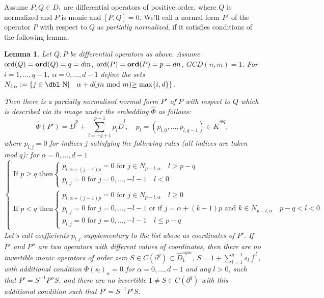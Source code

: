 \documentclass[11pt]{article}
\theoremstyle{definition}
\newcommand{\dn}{{\mbox{\dbl N}}}
\newcommand{\ord}{\mathop{\rm ord}\nolimits}
\theoremstyle{plain}
\newtheorem{lemma}{Lemma}[section]
\numberwithin{equation}{section}
\newcommand{\Ord}{\mathop {\rm \bf ord}}
\begin{document}
Assume $P,Q\in D_1$ are differential operators of positive order, where $Q$ is normalized and $P$ is monic and $[P,Q]=0$. We'll call a normal form $P'$ of the operator $P$ with respect to $Q$ as {\it partially normalized}, if it satisfies conditions of the following lemma.

\begin{lemma}
\label{L:normalisation}
Let $Q,P$ be differential operators as above. Assume $\ord (Q)=\Ord (Q)=q=dm$, $\ord (P)=\Ord (P)=p=dn$, 
$GCD(n,m)=1$. 
For $i=1, \ldots , q-1$, $\alpha = 0, \ldots , d-1$  define the sets $N_{i,\alpha}:=\{j\in \dn |\quad \mbox{$\alpha +d$($jn$ mod $m$)$\ge \max\{i,d\}$}\}$. 
  
Then there is a partially normalised normal form $P'$ of $P$ with respect to $Q$ which is described via 
its image under the embedding $\hat{\Phi}$ as follows: 
$$
\hat{\Phi}(P')=\tilde{D}^p +\sum_{l=-q+1}^{p-1} p_l \tilde{D}^l, \quad p_l=(p_{l,0},\ldots ,p_{l,q-1})\in \tilde{K}^{\oplus q},
$$
where $p_{l,j}=0$ for indices $j$ satisfying the following rules (all indices are taken mod $q$): for $\alpha = 0, \ldots , d-1$  
$$
\begin{cases}
\mbox{If $p\ge q$ then} 
\begin{cases}
p_{l,\alpha +(j-1)p}=\mbox{$0$ for $j\in N_{p-l, \alpha}$}\quad l>p-q \\
p_{l,j}=\mbox{$0$ for $j=0,\ldots ,-l-1$} \quad l<0
\end{cases}
\\
\mbox{If $p< q$ then}
\begin{cases}
p_{l,\alpha +(j-1)p}=\mbox{$0$ for $j\in N_{p-l, \alpha}$}\quad l\ge 0 \\
p_{l,j}=\mbox{$0$ for  $j=0,\ldots ,-l-1$ or if $j=\alpha +(k-1)p$ and $k\in N_{p-l, \alpha}$}\quad p-q<l<0 \\
p_{l,j}=\mbox{$0$ for $j=0,\ldots ,-l-1$} \quad l\le p-q
\end{cases}
\end{cases}
$$
Let's call coefficients $p_{l,j}$ supplementary to the list above as {\it coordinates} of  $P'$. If $P'$ and $P''$ are two operators with different values of coordinates, then there are no invertible monic  operators of order zero $S\in C(\partial^q)\subset \hat{D}_1^{sym}$, $S=1+\sum_{l=1}^{q-1}s_l\int^l$, with additional condition $\Phi (s_{l})_{\alpha}=0$ for $\alpha = 0, \ldots , d-1$ and any $l>0$, such that $P'=S^{-1}P''S$, and there are no invertible $1\neq S\in C(\partial^q)$ with this additional condition such that $P'=S^{-1}P'S$.
\end{lemma}
\end{document}
